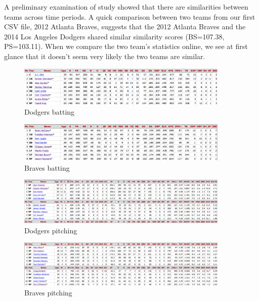 \documentclass[12pt]{article}
\numberwithin{equation}{subsection}
\begin{document}
A preliminary examination of study showed that there are similarities between teams across time periods. A quick comparison between two teams from our first CSV file, 2012 Atlanta Braves, suggests that the 2012 Atlanta Braves and the 2014 Los Angeles Dodgers shared similar similarity scores (BS=107.38, PS=103.11). When we compare the two team's statistics online, we see at first glance that it doesn't seem very likely the two teams are similar. 

\begin{figure}[H]
	\centering
	\includegraphics[width=0.9\textwidth]{dodgers1}
    \caption{Dodgers batting}
\end{figure}

\begin{figure}[H]
	\centering
	\includegraphics[width=0.9\textwidth]{braves1}
    \caption{Braves batting}
\end{figure}

\begin{figure}[H]
	\centering
	\includegraphics[width=0.9\textwidth]{dodgers2}
    \caption{Dodgers pitching}
\end{figure}

\begin{figure}[H]
	\centering
	\includegraphics[width=0.9\textwidth]{braves2}
    \caption{Braves pitching}
\end{figure}
\end{document}
